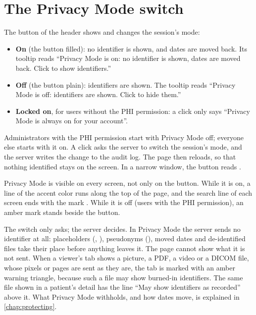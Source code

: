 \section{The Privacy Mode switch}
\label{sec:page-privacy}

The  button of the header shows and changes the session's mode:
\begin{itemize}
\item \textbf{On} (the button filled): no identifier is shown, and dates are moved back. Its
  tooltip reads ``Privacy Mode is on: no identifier is shown, dates are moved back. Click to show
  identifiers.''
\item \textbf{Off} (the button plain): identifiers are shown. The tooltip reads ``Privacy Mode
  is off: identifiers are shown. Click to hide them.''
\item \textbf{Locked on}, for users without the PHI permission: a click only says ``Privacy Mode
  is always on for your account''.
\end{itemize}
Administrators with the PHI permission start with Privacy Mode off; everyone else starts with it
on. A click asks the server to switch the session's mode, and the server writes the change to
the audit log. The page then reloads, so that nothing identified stays on the screen. In a narrow
window, the button reads .

Privacy Mode is visible on every screen, not only on the button. While it is on, a line of the
accent color runs along the top of the page, and the search line of each screen ends with the
mark . While it is off (users with the PHI permission), an amber mark
 stands beside the button.

\begin{phibox}
The switch only asks; the server decides. In Privacy Mode the server sends no identifier at
all: placeholders (, \code{[MRN]}), pseudonyms (),
moved dates and de-identified files take their place before anything leaves it. The page cannot
show what it is not sent. When a viewer's tab shows a picture, a PDF, a video or a DICOM file,
whose pixels or pages are sent as they are, the tab is marked with an amber warning triangle,
because such a file may show burned-in identifiers. The same file shown in a patient's detail
has the line ``May show identifiers as recorded'' above it. What Privacy Mode withholds, and how dates
move, is explained in \cref{chap:protecting}.
\end{phibox}

